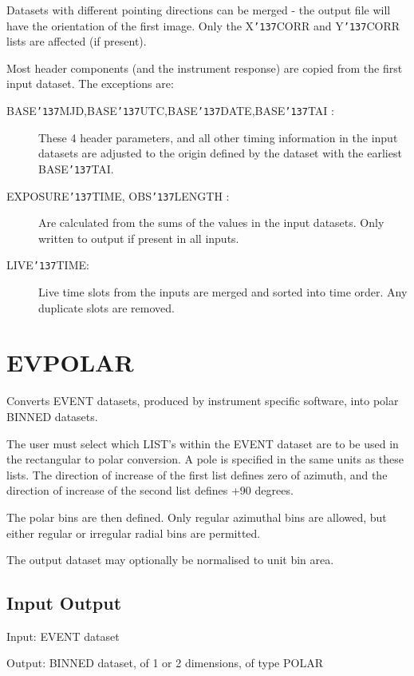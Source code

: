 \documentclass{book}
\renewcommand{\_}{{\tt\char'137}}     %
\begin{document}
Datasets with different pointing directions can be merged - the
output file will have the orientation of the first image. Only the
X\_CORR and Y\_CORR lists are affected (if present).

Most header components (and the instrument response) are copied
from the first input dataset. The exceptions are:


\begin{description}
\item[BASE\_MJD,BASE\_UTC,BASE\_DATE,BASE\_TAI :]
These 4 header parameters, and all other timing information in
the input datasets are adjusted to the origin defined by the
dataset with the earliest BASE\_TAI.
\item[EXPOSURE\_TIME, OBS\_LENGTH :]
Are calculated from the sums of the values in the input datasets.
Only written to output if present in all inputs.
\item[LIVE\_TIME:]
Live time slots from the inputs are merged and sorted into time
order. Any duplicate slots are removed.
\end{description}
\section{EVPOLAR}
Converts EVENT datasets, produced by instrument specific software,
into polar BINNED datasets.

The user must select which LIST's within the EVENT dataset are to
be used in the rectangular to polar conversion. A pole is specified
in the same units as these lists. The direction of increase of the
first list defines zero of azimuth, and the direction of increase of
the second list defines +90 degrees.

The polar bins are then defined. Only regular azimuthal bins are
allowed, but either regular or irregular radial bins are permitted.

The output dataset may optionally be normalised to unit bin area.

\subsection{Input Output}
Input: EVENT dataset

Output: BINNED dataset, of 1 or 2 dimensions, of type POLAR
\end{document}
